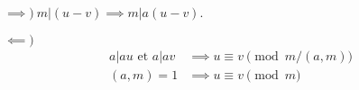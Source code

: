 \documentclass[executivepaper,leqno]{amsart}
\renewcommand\gcd[2]{\left(#1,#2\right)}
\begin{document}
\begin{minipage}{4in}
\begin{minipage}{4in}
    $\implies\bigr)\ m|(u-v) \implies m|a(u-v)$.
\end{minipage}
\begin{minipage}{3in}
    $\impliedby\bigr)$
    \begin{align*}
        a|au \text{ et } a|av &\implies u \equiv v \pmod{m/\gcd am}\\
        \gcd am = 1 &\implies u \equiv v \pmod m
    \end{align*}
\end{minipage}
\end{minipage}
\end{document}
